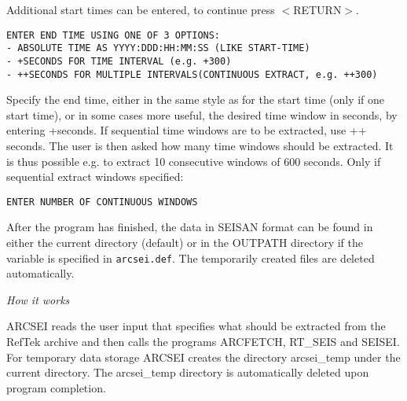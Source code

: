 Additional start times can be entered, to continue press $<$RETURN$>$. 

\begin{verbatim}
ENTER END TIME USING ONE OF 3 OPTIONS: 
- ABSOLUTE TIME AS YYYY:DDD:HH:MM:SS (LIKE START-TIME)
- +SECONDS FOR TIME INTERVAL (e.g. +300)
- ++SECONDS FOR MULTIPLE INTERVALS(CONTINUOUS EXTRACT, e.g. ++300) 
\end{verbatim}

Specify the end time, either in the same style as for the start time (only if one start time), or in some cases more useful, the desired time window in seconds, by entering +seconds. If sequential time windows are to be extracted, use ++ seconds. The user is then asked how many time windows should be extracted. It is thus possible e.g. to extract 10 consecutive windows of 600 seconds. 
Only if sequential extract windows specified: 

\begin{verbatim}
ENTER NUMBER OF CONTINUOUS WINDOWS 
\end{verbatim}

After the program has finished, the data in SEISAN format can be 
found in either the current directory (default) or in the OUTPATH 
directory if the variable is specified in \texttt{arcsei.def}. The temporarily 
created files are deleted automatically. 

\textit{How it works}

ARCSEI reads the user input that specifies what should be extracted from the RefTek archive and then calls the programs ARCFETCH, RT\_SEIS and SEISEI. For temporary data storage ARCSEI creates the directory arcsei\_temp under the current directory. The arcsei\_temp directory is automatically deleted upon program completion. 

